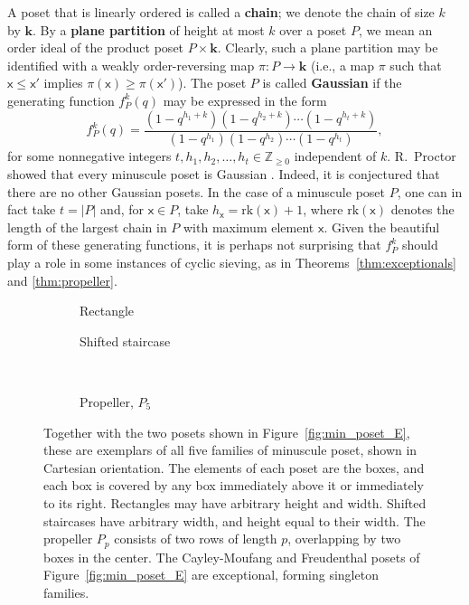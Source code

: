\documentclass[12pt]{amsart}
\newcommand{\x}{\ensuremath{\mathsf{x}}}
\theoremstyle{definition}
\theoremstyle{remark}
\numberwithin{equation}{section}
\newcommand{\rank}{\ensuremath{\mathrm{rk}}}
\begin{document}
A poset that is linearly ordered is called a {\bf chain}; we denote the chain of size $k$ by $\mathbf{k}$. By a {\bf plane partition} of height at most $k$ over a poset $P$, we mean an order ideal of the product poset $P \times \mathbf{k}$.  Clearly, such a plane partition may be identified with a weakly order-reversing map $\pi : P \to \mathbf{k}$ (i.e., a map $\pi$ such that $\x \leq \x'$ implies $\pi(\x) \geq \pi(\x')$). The poset $P$ is called {\bf Gaussian} if the generating function $f_P^k(q)$ may be expressed in the form
\[
f_P^k(q) = \frac{(1 - q^{h_1 + k})(1 - q^{h_2 + k})\cdots(1 - q^{h_t + k})}{(1 - q^{h_1})(1 - q^{h_2})\cdots(1 - q^{h_t})},
\]
for some nonnegative integers $t, h_1, h_2, \dots, h_t \in \mathbb{Z}_{\geq 0}$ independent of $k$.
R.~Proctor showed that every minuscule poset is Gaussian \cite{Proctor}. Indeed, it is conjectured that there are no other Gaussian posets. In the case of a minuscule poset $P$, one can in fact take $t = |P|$ and, for $\x \in P$, take $h_\x = \rank(\x) + 1$, where $\rank(\x)$ denotes the length of the largest chain in $P$ with maximum element $\x$. Given the beautiful form of these generating functions, it is perhaps not surprising that $f_P^k$ should play a role in some instances of cyclic sieving, as in Theorems~\ref{thm:exceptionals} and \ref{thm:propeller}. 

\begin{figure}[h]
	\begin{subfigure}[b]{0.27\textwidth}
		\centering
		\caption{Rectangle}
	\end{subfigure}
	\hspace{2cm}
	\begin{subfigure}[b]{0.27\textwidth}
		\centering
		\caption{Shifted staircase}
	\end{subfigure} \\
	\vspace{3mm}
	\begin{subfigure}[b]{0.27\textwidth}
		\centering
		\caption{Propeller, $P_5$}
	\end{subfigure}
\caption{Together with the two posets shown in Figure~\ref{fig:min_poset_E}, these are exemplars of all five families of minuscule poset, shown in Cartesian orientation. The elements of each poset are the boxes, and each box is covered by any box immediately above it or immediately to its right. Rectangles may have arbitrary height and width. Shifted staircases have arbitrary width, and height equal to their width. The propeller $P_p$ consists of two rows of length $p$, overlapping by two boxes in the center. The Cayley-Moufang and Freudenthal posets of Figure~\ref{fig:min_poset_E} are exceptional, forming singleton families.}\label{fig:min_poset}
\end{figure}
\end{document}
